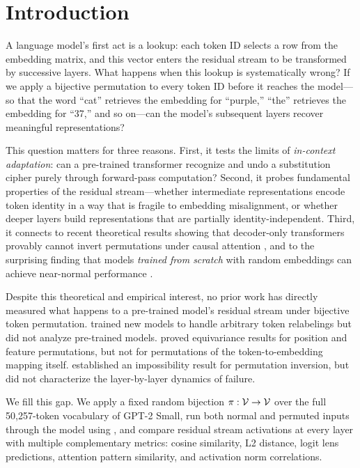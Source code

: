 \section{Introduction}
\label{sec:introduction}

A language model's first act is a lookup: each token ID selects a row from the embedding matrix, and this vector enters the residual stream to be transformed by successive layers. What happens when this lookup is systematically wrong? If we apply a bijective permutation to every token ID before it reaches the model---so that the word ``cat'' retrieves the embedding for ``purple,'' ``the'' retrieves the embedding for ``37,'' and so on---can the model's subsequent layers recover meaningful representations?

This question matters for three reasons.
First, it tests the limits of \emph{in-context adaptation}: can a pre-trained transformer recognize and undo a substitution cipher purely through forward-pass computation?
Second, it probes fundamental properties of the residual stream---whether intermediate representations encode token identity in a way that is fragile to embedding misalignment, or whether deeper layers build representations that are partially identity-independent.
Third, it connects to recent theoretical results showing that decoder-only transformers provably cannot invert permutations under causal attention \citep{alur2025impossibility}, and to the surprising finding that models \emph{trained from scratch} with random embeddings can achieve near-normal performance \citep{huang2023lexinvariant}.

Despite this theoretical and empirical interest, no prior work has directly measured what happens to a pre-trained model's residual stream under bijective token permutation.
\citet{huang2023lexinvariant} trained new models to handle arbitrary token relabelings but did not analyze pre-trained models.
\citet{xu2024permutation} proved equivariance results for position and feature permutations, but not for permutations of the token-to-embedding mapping itself.
\citet{alur2025impossibility} established an impossibility result for permutation inversion, but did not characterize the layer-by-layer dynamics of failure.

We fill this gap.
We apply a fixed random bijection $\pi: \mathcal{V} \to \mathcal{V}$ over the full 50,257-token vocabulary of GPT-2 Small, run both normal and permuted inputs through the model using \translens, and compare residual stream activations at every layer with multiple complementary metrics: cosine similarity, L2 distance, logit lens predictions, attention pattern similarity, and activation norm correlations.

